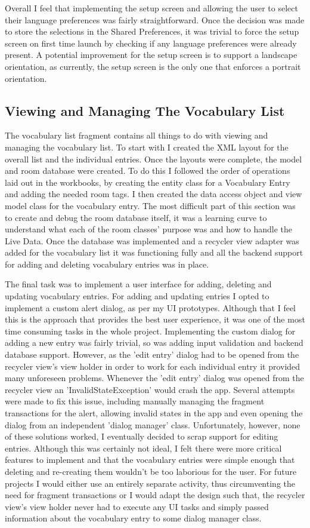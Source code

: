 \documentclass[runningheads]{llncs}
\begin{document}
	Overall I feel that implementing the setup screen and allowing the user to select their language preferences was fairly straightforward. Once the decision was made to store the selections in the Shared Preferences, it was trivial to force the setup screen on first time launch by checking if any language preferences were already present. A potential improvement for the setup screen is to support a landscape orientation, as currently, the setup screen is the only one that enforces a portrait orientation.
	\subsection{Viewing and Managing The Vocabulary List}\label{ref_vocab_list}
	The vocabulary list fragment contains all things to do with viewing and managing the vocabulary list. To start with I created the XML layout for the overall list and the individual entries. Once the layouts were complete, the model and room database were created. To do this I followed the order of operations laid out in the workbooks, by creating the entity class for a Vocabulary Entry and adding the needed room tags. I then created the data access object and view model class for the vocabulary entry. The most difficult part of this section was to create and debug the room database itself, it was a learning curve to understand what each of the room classes' purpose was and how to handle the Live Data. Once the database was implemented and a recycler view adapter was added for the vocabulary list it was functioning fully and all the backend support for adding and deleting vocabulary entries was in place.
	
	The final task was to implement a user interface for adding, deleting and updating vocabulary entries. For adding and updating entries I opted to implement a custom alert dialog, as per my UI prototypes. Although that I feel this is the approach that provides the best user experience, it was one of the most time consuming tasks in the whole project. Implementing the custom dialog for adding a new entry was fairly trivial, so was adding input validation and backend database support. However, as the 'edit entry' dialog had to be opened from the recycler view's view holder in order to work for each individual entry it provided many unforeseen problems. Whenever the 'edit entry' dialog was opened from the recycler view an 'InvalidStateException' would crash the app. Several attempts were made to fix this issue, including manually managing the fragment transactions for the alert, allowing invalid states in the app and even opening the dialog from an independent 'dialog manager' class. Unfortunately, however, none of these solutions worked, I eventually decided to scrap support for editing entries. Although this was certainly not ideal, I felt there were more critical features to implement and that the vocabulary entries were simple enough that deleting and re-creating them wouldn't be too laborious for the user. For future projects I would either use an entirely separate activity, thus circumventing the need for fragment transactions or I would adapt the design such that, the recycler view's view holder never had to execute any UI tasks and simply passed information about the vocabulary entry to some dialog manager class.
	
\end{document}
